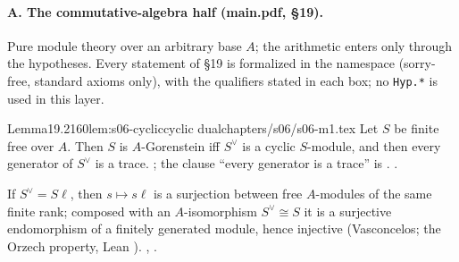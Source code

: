 \paragraph{A. The commutative-algebra half (main.pdf, \S19).} Pure module theory over an arbitrary base $A$; the arithmetic enters only
through the hypotheses. Every statement of \S19 is formalized in the namespace  (sorry-free, standard
axioms only), with the qualifiers stated in each box; no \texttt{Hyp.*} is used in this layer.

\begin{quoted}{Lemma}{19.2}{160}{lem:s06-cyclic}{cyclic dual}{chapters/s06/s06-m1.tex}\label{rpt:lem:s06-cyclic}
Let $S$ be finite free over $A$. Then $S$ is $A$-Gorenstein iff $S^\vee$ is a cyclic $S$-module, and then every generator of $S^\vee$ is a
trace. \stproved{} ; the clause ``every generator is a trace'' is . \stformalized{}.
\end{quoted}
\begin{outline}
If $S^\vee=S\ell$, then $s\mapsto s\ell$ is a surjection between free $A$-modules of the same finite rank; composed with an
$A$-isomorphism $S^\vee\cong S$ it is a surjective endomorphism of a finitely generated module, hence injective (Vasconcelos; the
Orzech property, Lean ). \stproved, \stformal.
\end{outline}

